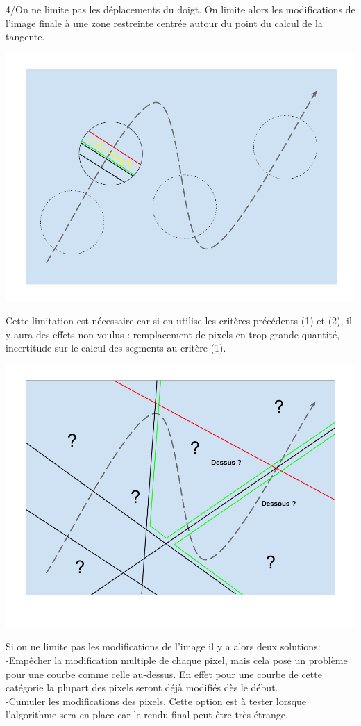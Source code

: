 \documentclass[a4paper,12pt]{report}
\begin{document}
4/On ne limite pas les déplacements du doigt.
On limite alors les modifications de l’image finale à une zone restreinte centrée autour du point du calcul de la tangente.
\begin{center}
 \includegraphics[scale=0.2]{./obturateur4.png}
\end{center}
Cette limitation est nécessaire car si on utilise les critères précédents (1) et (2),
il y aura des effets non voulus : remplacement de pixels en trop grande quantité, incertitude sur le calcul des segments au critère (1).
\begin{center}
 \includegraphics[scale=0.2]{./obturateur4exp.png}
\end{center}
Si on ne limite pas les modifications de l'image il y a alors deux solutions:
\\\indent -Empêcher la modification multiple de chaque pixel, mais cela pose un problème pour une courbe comme celle au-dessus.
En effet pour une courbe de cette catégorie la plupart des pixels seront déjà modifiés dès le début.
\\\indent -Cumuler les modifications des pixels. Cette option est à tester lorsque l'algorithme sera en place car le rendu final peut être très étrange.
\end{document}
